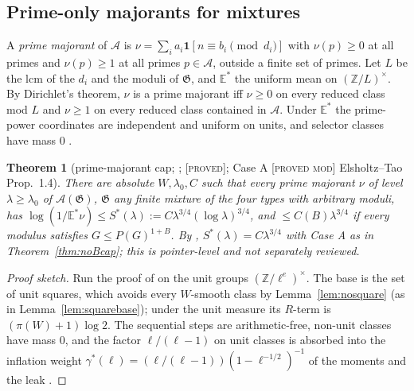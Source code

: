 \documentclass[10pt,reqno]{amsart}
\newtheorem{theorem}{Theorem}[section]
\theoremstyle{definition}
\theoremstyle{remark}
\newcommand{\A}{\mathcal A}
\newcommand{\cG}{\mathfrak G}
\newcommand{\E}{\mathbb E}
\newcommand{\Z}{\mathbb Z}
\newcommand{\ind}{\mathbf 1}
\newcommand{\lab}[1]{\textup{[\textsc{#1}]}}
\begin{document}
\subsection{Prime-only majorants for mixtures}
A \emph{prime majorant} of $\A$ is $\nu=\sum_ia_i\ind[n\equiv b_i\pmod{d_i}]$ with
$\nu(p)\geq0$ at all primes and $\nu(p)\geq1$ at all primes $p\in\A$, outside a
finite set of primes.  Let $L$ be the lcm of the $d_i$ and the moduli of
$\cG$, and $\E^*$ the uniform mean on $(\Z/L)^\times$.  By Dirichlet's theorem,
$\nu$ is a prime majorant iff $\nu\geq0$ on every reduced class mod $L$ and
$\nu\geq1$ on every reduced class contained in $\A$.  Under $\E^*$ the
prime-power coordinates are independent and uniform on units, and
selector classes have mass $0$ \cite[Lemmas~1.2, 1.3]{PL}.

\begin{theorem}[prime-majorant cap; {\cite[Thm~3.1]{PL}}; \lab{proved}; Case A \lab{proved mod} Elsholtz--Tao Prop.~1.4]\label{thm:PLcap}
There are absolute $W,\lambda_0,C$ such that every prime majorant $\nu$ of level
$\lambda\geq\lambda_0$ of $\A(\cG)$, $\cG$ any finite mixture of the four types with
arbitrary moduli, has $\log(1/\E^*\nu)\leq S^*(\lambda):=C\lambda^{3/4}(\log\lambda)^{3/4}$, and
$\leq C(B)\lambda^{3/4}$ if every modulus satisfies $G\leq P(G)^{1+B}$.  By
\cite[\S4.3]{KA3}, $S^*(\lambda)=C\lambda^{3/4}$ with Case A as in
Theorem~\ref{thm:noBcap}; this is pointer-level and not separately reviewed.
\end{theorem}
\begin{proof}[Proof sketch]
Run the proof of \cite[Thm~5.1]{KA2} on the unit groups $(\Z/\ell^e)^\times$.  The
base is the set of unit squares, which avoids every $W$-smooth class by
Lemma~\ref{lem:nosquare} (as in Lemma~\ref{lem:squarebase}); under the unit
measure its $R$-term is $(\pi(W)+1)\log2$.  The
sequential steps are arithmetic-free, non-unit classes have mass $0$, and
the factor $\ell/(\ell-1)$ on unit classes is absorbed into the inflation weight
$\gamma^*(\ell)=(\ell/(\ell-1))(1-\ell^{-1/2})^{-1}$ of the moments and the leak
\cite[Lemmas~2.3--2.5]{PL}.
\end{proof}
\end{document}
